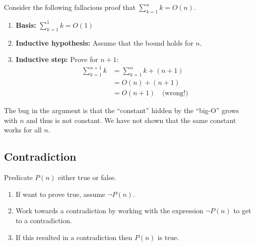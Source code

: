     \begin{warning}
        Consider the following fallacious proof that \( \sum_{k=1}^n k = O(n) \). 
        \begin{enumerate}
            \item \textbf{Basis:} \( \sum_{k=1}^1 k = O(1) \) 
            \item \textbf{Inductive hypothesis:} Assume that the bound holds for \( n \).
            \item \textbf{Inductive step:} Prove for $n+1$:
            \begin{align*}
                \sum_{k=1}^{n+1} k &= \sum_{k=1}^{n} k + (n + 1) \\
                                    &= O(n) + (n + 1) \\
                                    &= O(n + 1) \quad \text{(wrong!)}
            \end{align*}
        \end{enumerate}

        The bug in the argument is that the “constant” hidden by the “big-O” grows with \( n \) and thus is not constant. We have not shown that the same constant works for all \( n \).
    \end{warning}

\subsection{Contradiction}
    \begin{process}
        Predicate $P(n)$ either true or false.
        \begin{enumerate}
            \item If want to prove true, assume $\neg P(n)$.
            \item Work towards a contradiction by working with the expression $\neg P(n)$ to get to a contradiction.
            \item If this resulted in a contradiction then $P(n)$ is true. 
        \end{enumerate}
        
    \end{process}

